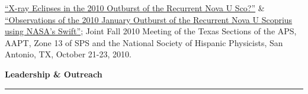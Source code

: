 \documentclass[letter,11pt]{article}
\begin{document}
\begin{etaremune}




\item \href{http://adsabs.harvard.edu/abs/2010APS..TSFFP1019V}{“X-ray Eclipses in the 2010 Outburst of the Recurrent Nova U Sco?”} \&  \href{http://adsabs.harvard.edu/abs/2010APS..TSFFP1013M}{“Observations of the 2010 January Outburst of the Recurrent Nova U Scoprius using NASA's Swift”}; Joint Fall 2010 Meeting of the Texas Sections of the APS, AAPT, Zone 13 of SPS and the National Society of Hispanic Physicists, San Antonio, TX, October 21-23, 2010.

\end{etaremune}



\noindent
{\bf Leadership \& Outreach} \\
\vspace{-9mm}
\begin{center}
\rule{\textwidth}{0.2mm}
\end{center}
\vspace{-3mm}
\end{document}
